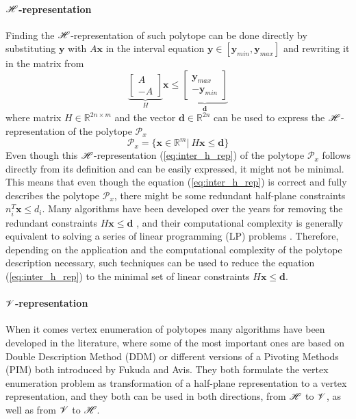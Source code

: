 \paragraph*{$\mathscr{H}$-representation} Finding the $\mathscr{H}$-representation of such polytope can be done directly by substituting $\bm{y}$ with $A\bm{x}$ in the interval equation $\bm{y}\in[\bm{y}_{min},\bm{y}_{max}]$ and rewriting it in the matrix from
\begin{equation}
   \underbrace{\begin{bmatrix}
        A\\
        -A
    \end{bmatrix}}_{H}\bm{x} \leq \underbrace{\begin{bmatrix}
         \bm{y}_{max}\\
        -\bm{y}_{min} 
    \end{bmatrix} }_{\bm{d}}
\end{equation}
where matrix $H\in\mathbb{R}^{2n \times m}$ and the vector $\bm{d}\in\mathbb{R}^{2n}$ can be used to express the $\mathscr{H}$-representation of the polytope $\mathcal{P}_x$
\begin{equation}
    \mathcal{P}_x=\{\bm{x}\in\mathbb{R}^m |~ H\bm{x} \leq \bm{d} \}
    \label{eq:inter_h_rep}
\end{equation}
 Even though this $\mathscr{H}$-representation (\ref{eq:inter_h_rep}) of the polytope $\mathcal{P}_x$ follows directly from its definition and can be easily expressed, it might not be minimal. This means that even though the equation (\ref{eq:inter_h_rep}) is correct and fully describes the polytope $\mathcal{P}_x$, there might be some redundant half-plane constraints $n_i^T\bm{x}\leq d_i$. Many algorithms have been developed over the years for removing the redundant constraints $H\bm{x}\leq\bm{d}$ \cite{Paulraj2006}, and their computational complexity is generally equivalent to solving a series of linear programming (LP) problems \cite{Telgen1983}. Therefore, depending on the application and the computational complexity of the polytope description necessary, such techniques can be used to reduce the equation (\ref{eq:inter_h_rep}) to the minimal set of linear constraints $H\bm{x}\leq \bm{d}$.
 
\paragraph*{$\mathscr{V}$-representation} 
When it comes vertex enumeration of polytopes many algorithms have been developed in the literature, where some of the most important ones are based on Double Description Method (DDM)\cite{fukuda_dd} or different versions of a Pivoting Methods (PIM)\cite{avis_pivoting_nodate} both introduced by Fukuda and Avis. They both formulate the vertex enumeration problem as transformation of a half-plane representation to a vertex representation, and they both can be used in both directions, from $\mathscr{H}$ to $\mathscr{V}$, as well as from $\mathscr{V}$ to $\mathscr{H}$. 

